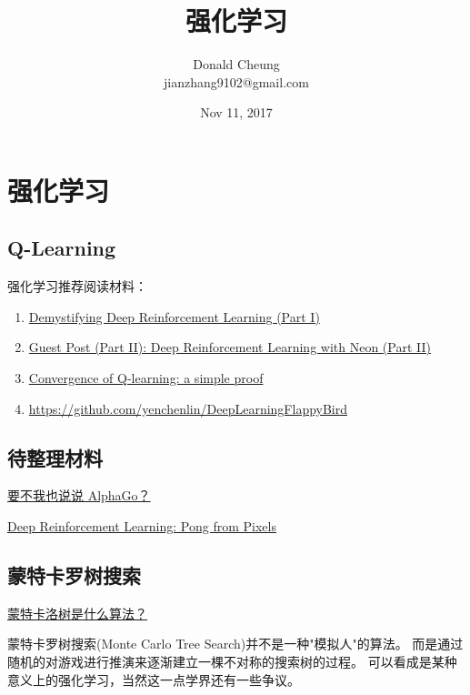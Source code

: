 \documentclass[10pt,a4paper]{ctexbook}
\title{强化学习}
\author{Donald Cheung\\jianzhang9102@gmail.com}
\date{Nov 11, 2017}
\begin{document}
    \maketitle
    \tableofcontents
\fi

\chapter{强化学习}

\section{Q-Learning}

强化学习推荐阅读材料：
\begin{enumerate}
    \item \href{https://ai.intel.com/demystifying-deep-reinforcement-learning/}{Demystifying Deep Reinforcement Learning (Part I)}
    \item \href{https://ai.intel.com/deep-reinforcement-learning-with-neon/}{Guest Post (Part II): Deep Reinforcement Learning with Neon (Part II)}
    \item \href{http://simplecore-dev.intel.com/nervana/wp-content/uploads/sites/55/2015/12/ProofQlearning.pdf}{Convergence of Q-learning: a simple proof}
    \item \url{https://github.com/yenchenlin/DeepLearningFlappyBird}
\end{enumerate}


\section{待整理材料}

\href{https://mp.weixin.qq.com/s?__biz=MzA5MDE2MjQ0OQ==&mid=2652786766&idx=1&sn=bf6f3189e4a16b9f71f985392c9dc70b&chksm=8be52430bc92ad2644838a9728d808d000286fb9ca7ced056392f1210300286f63bd991bde84#rd}{要不我也说说 AlphaGo？}

\href{http://karpathy.github.io/2016/05/31/rl/}{Deep Reinforcement Learning: Pong from Pixels}


\section{蒙特卡罗树搜索}
\href{https://www.zhihu.com/question/39916945}{蒙特卡洛树是什么算法？}


蒙特卡罗树搜索(Monte Carlo Tree Search)并不是一种"模拟人"的算法。
而是通过随机的对游戏进行推演来逐渐建立一棵不对称的搜索树的过程。
可以看成是某种意义上的强化学习，当然这一点学界还有一些争议。
\end{document}

